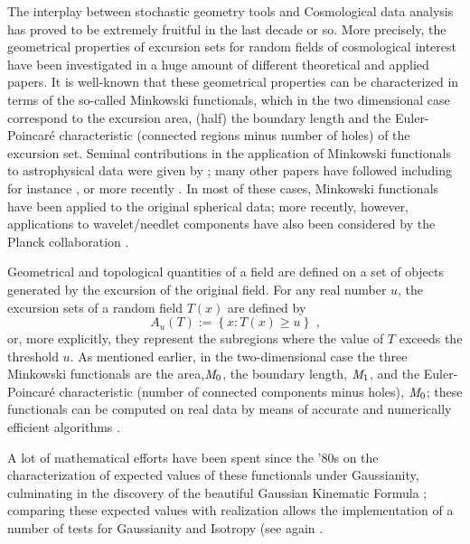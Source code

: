 \documentclass[aps,prd,showpacs,superscriptaddress,groupedaddress]{revtex4-1}  %
\begin{document}
The interplay between stochastic geometry tools and Cosmological data analysis has proved to be extremely fruitful in the last decade or so. More precisely, the geometrical properties of excursion sets for random fields of cosmological interest have been investigated in a huge amount of different theoretical and applied papers. It is well-known that these geometrical properties can be characterized in terms of the so-called Minkowski functionals, which in the two dimensional case correspond to the excursion area, (half) the boundary length and the Euler-Poincar\'e characteristic (connected regions minus number of holes) of the excursion set. Seminal contributions in the application of Minkowski functionals to astrophysical data were given by \cite{tomita1986_genus,
Coles1988_mfCMB}; many other papers have followed including for instance \cite{schmalzing1997_mf,
  dolgov1999_mfpolm, naselsky1998_mfPol, Novikov2000_mfCMB,
  schmalzing1998_mfreview,matsubara2003_mf2PT,
  wmap2003_wmf,wmap2007_wmf,starck2007}, or more recently \cite{natoli2010mfBoomrang, matsubara2010_mfFnl,
  ducout2013_mfFnl, gratten2012_mfLSSreview, munshi2013_mfSkewCl,planck2013_IS}. In most of these cases, Minkowski functionals have been applied to the original spherical data; more recently, however, applications to wavelet/needlet components have also been considered by the Planck collaboration \cite{planck2014-a18}.


Geometrical and topological quantities of a field are defined on a set of objects generated by the excursion of the original field. For any real number $u$, the excursion sets of a random field $T(x)$ are defined by%
\begin{equation}
A_{u}(T):=\left\{ x:T(x) \geq u\right\} \text{ ,}
\end{equation}
or, more explicitly, they represent the subregions where the value of $T$ exceeds the threshold $u$. As mentioned earlier, in the  two-dimensional case the three Minkowski functionals are the area,$\emph{M}_{0}$, the boundary length, $\emph{M}_{1}$, and the Euler-Poincar\'{e} characteristic (number of connected components minus holes), $\emph{M}_{0}$; these functionals can be computed on real data by means of
accurate and numerically efficient algorithms \cite{KLENK2006127, Guderlei2007, Gay2012_NGPeaks}. 

A lot of mathematical efforts have been spent since the '80s on the characterization of expected values of these functionals under Gaussianity, culminating in the discovery of the beautiful Gaussian Kinematic Formula \cite{TaylorAdler2009}; comparing these expected values with realization allows the implementation of a number of tests for Gaussianity and Isotropy (see again \cite{planck2013-p09, planck2014-a18}.
\end{document}
